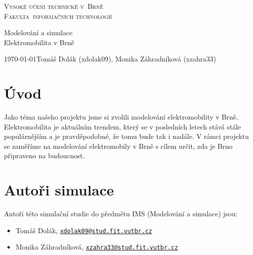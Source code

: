 \documentclass[a4paper,11pt]{article}
\begin{document}
\begin{titlepage}
    \begin{center}
        
        \Huge
        \textsc{Vysoké učení technické v~Brně}\\[0.1em]
        
        \huge
        \textsc{Fakulta~informačních technologií}
        
        
        \LARGE
        Modelování a simulace \\
        Elektromobilita v Brně

    \end{center}
    
    {\large \today \hfill Tomáš Dolák (xdolak09), Monika Záhradníková (xzahra33)}
\end{titlepage}

\newpage
\tableofcontents

\newpage
\label{firstpage}

\section{Úvod}
Jako téma našeho projektu jsme si zvolili modelování elektromobility v Brně. Elektromobilita je aktuálním trendem,
který se v posledních letech stává stále populárnějším a je pravděpodobné, že tomu bude tak i nadále.
V rámci projektu se zaměříme na modelování elektromobily v Brně s cílem určit, zda je Brno připraveno
na budoucnost.\cite{simlib_cpp}

\section{Autoři simulace}
Autoři této simulační studie do předmětu IMS (Modelování a simulace) jsou:

\begin{itemize}
    \item Tomáš Dolák, \href{mailto:xdolak09@stud.fit.vutbr.cz}{\texttt{xdolak09@stud.fit.vutbr.cz}}
    \item Monika Záhradníková, \href{mailto:xzahra33@stud.fit.vutbr.cz}{\texttt{xzahra33@stud.fit.vutbr.cz}} \\
\end{itemize}
\end{document}
